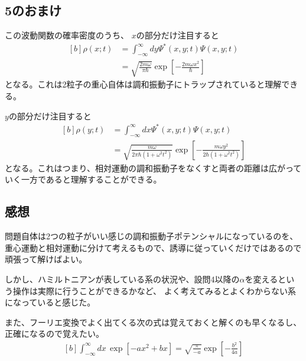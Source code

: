 \documentclass[../../sp_2016.tex]{subfiles}
\begin{document}
\subsection*{5のおまけ}
この波動関数の確率密度のうち、
\(x\)の部分だけ注目すると
\begin{equation}\begin{aligned}[b]
    \rho(x;t) &= \int_{-\infty}^{\infty}dy\Psi^*(x,y;t)\Psi(x,y;t)\\
    &=\sqrt{\frac{2m\omega}{\pi\hbar}}\exp[-\frac{2m\omega x^2}{\hbar}]
\end{aligned}\end{equation}
となる。これは2粒子の重心自体は調和振動子にトラップされていると理解できる。

\(y\)の部分だけ注目すると
\begin{equation}\begin{aligned}[b]
    \rho(y;t) &= \int_{-\infty}^{\infty}dx \Psi^*(x,y;t)\Psi(x,y;t)\\
    &= \sqrt{\frac{m\omega}{2\pi\hbar(1+\omega^2 t^2)}}\exp[-\frac{m\omega y^2}{2\hbar(1+\omega^2t^2)}]
\end{aligned}\end{equation}
となる。これはつまり、相対運動の調和振動子をなくすと両者の距離は広がっていく一方であると理解することができる。

\subsection*{感想}
問題自体は2つの粒子がいい感じの調和振動子ポテンシャルになっているのを、
重心運動と相対運動に分けて考えるもので、誘導に従っていくだけではあるので頑張って解けばよい。

しかし、ハミルトニアンが表している系の状況や、設問4以降の\(\alpha\)を変えるという操作は実際に行うことができるかなど、
よく考えてみるとよくわからない系になっていると感じた。

また、フーリエ変換でよく出てくる次の式は覚えておくと解くのも早くなるし、正確になるので覚えたい。
\begin{equation}\begin{aligned}[b]
    \int_{-\infty}^{\infty}dx\,\exp[-ax^2+bx] = \sqrt{\frac{\pi}{-a}}\exp[-\frac{b^2}{4a}]
\end{aligned}\end{equation}
\end{document}
